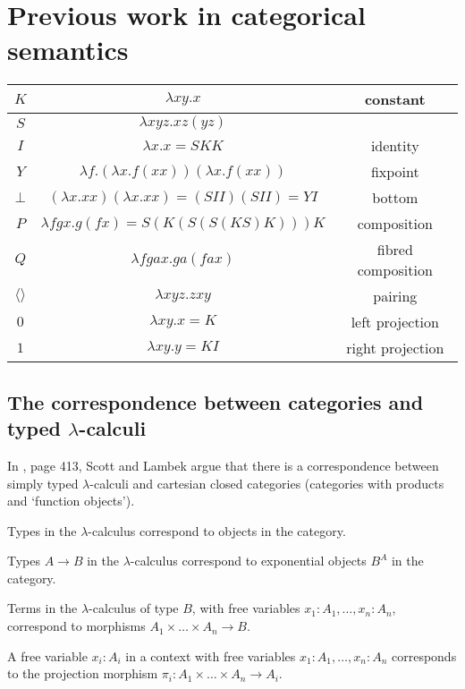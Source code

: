 \chapter{Previous work in categorical semantics}

\begin{tabular}{|c|c|c|}\hline
  $ K $ & $ \lambda xy.x $ & constant \\\hline
  $ S $ & $ \lambda xyz.xz(yz) $ & \\\hline
  $ I $ & $ \lambda x.x = SKK $ & identity \\\hline
  $ Y $ & $ \lambda f.(\lambda x.f (xx))(\lambda x.f (xx)) $ & ﬁxpoint \\\hline
  $ \bot $ & $ (\lambda x.xx)(\lambda x.xx) = (SII)(SII) = YI $ & bottom \\\hline
  $ P $ & $ \lambda f gx.g(f x) = S(K(S(S(KS)K)))K $ & composition \\\hline
  $ Q $ & $ \lambda f gax.ga(f ax) $ & ﬁbred composition \\\hline
  $ \langle \rangle $ & $ \lambda xyz.zxy $ & pairing \\\hline
  $ 0 $ & $ \lambda xy.x = K $ & left projection \\\hline
  $ 1 $ & $ \lambda xy.y = KI $ & right projection \\\hline
\end{tabular}

\section{The correspondence between categories and typed \texorpdfstring{$ \lambda $}{lambda}-calculi}\label{sec:lambek-correspondence}
In \cite{curry}, page 413, Scott and Lambek argue that there is a correspondence between simply typed $ \lambda $-calculi and cartesian closed categories (categories with products and `function objects').

Types in the $ \lambda $-calculus correspond to objects in the category.

Types $ A \to B $ in the $ \lambda $-calculus correspond to exponential objects $ B^A $ in the category.

Terms in the $ \lambda $-calculus of type $ B $, with free variables $ x_1: A_1, \dots, x_n: A_n $, correspond to morphisms $ A_1 \times \dots \times A_n \to B $.

A free variable $ x_i: A_i $ in a context with free variables $ x_1: A_1, \dots, x_n: A_n $ corresponds to the projection morphism $ \pi_i : A_1 \times \dots \times A_n \to A_i $.

